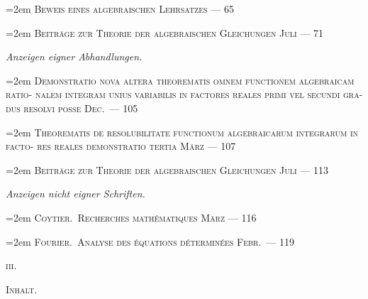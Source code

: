 \documentclass[12pt,a4paper]{article}
\begin{document}
\vspace{0.3em}
\noindent\hangindent=2em
\textsc{Beweis eines algebraischen Lehrsatzes  \dotfill --- 65}

\vspace{0.3em}
\noindent\hangindent=2em
\textsc{Beitr\"age zur Theorie der algebraischen Gleichungen  Juli \dotfill --- 71}

\vspace{0.5em}
\noindent\textit{Anzeigen eigner Abhandlungen.}

\vspace{0.3em}
\noindent\hangindent=2em
\textsc{Demonstratio nova altera theorematis omnem functionem algebraicam ratio-\linebreak
\hspace*{\fill} nalem integram unius variabilis in factores reales primi vel secundi gra-\linebreak
\hspace*{\fill} dus resolvi posse  Dec.\ \dotfill --- 105}

\vspace{0.3em}
\noindent\hangindent=2em
\textsc{Theorematis de resolubilitate functionum algebraicarum integrarum in facto-\linebreak
\hspace*{\fill} res reales demonstratio tertia  M\"arz \dotfill --- 107}

\vspace{0.3em}
\noindent\hangindent=2em
\textsc{Beitr\"age zur Theorie der algebraischen Gleichungen  Juli \dotfill --- 113}

\vspace{0.5em}
\noindent\textit{Anzeigen nicht eigner Schriften.}

\vspace{0.3em}
\noindent\hangindent=2em
\textsc{Coytier.\ Recherches math\'ematiques  M\"arz \dotfill --- 116}

\vspace{0.3em}
\noindent\hangindent=2em
\textsc{Fourier.\ Analyse des \'equations d\'etermin\'ees  Febr.\ \dotfill --- 119}

\vspace{1em}
\hfill\textsc{iii.}

\newpage

\begin{center}
\textsc{Inhalt.}
\end{center}
\end{document}
